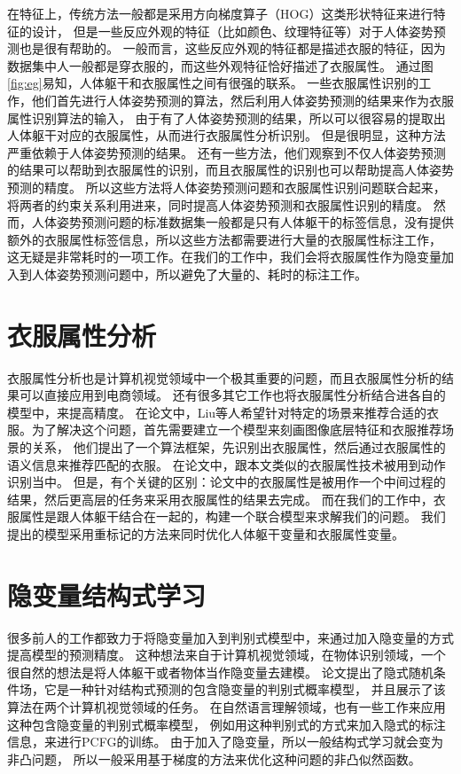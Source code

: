 在特征上，传统方法一般都是采用方向梯度算子（HOG）这类形状特征来进行特征的设计，
但是一些反应外观的特征（比如颜色、纹理特征等）对于人体姿势预测也是很有帮助的\cite{bmvc09}。
一般而言，这些反应外观的特征都是描述衣服的特征，因为数据集中人一般都是穿衣服的，而这些外观特征恰好描述了衣服属性。
通过图\ref{fig:eg}易知，人体躯干和衣服属性之间有很强的联系。
一些衣服属性识别的工作\cite{clotheccv,clothliu,poselets,junchi}，他们首先进行人体姿势预测的算法，然后利用人体姿势预测的结果来作为衣服属性识别算法的输入，
由于有了人体姿势预测的结果，所以可以很容易的提取出人体躯干对应的衣服属性，从而进行衣服属性分析识别。
但是很明显，这种方法严重依赖于人体姿势预测的结果。
还有一些方法\cite{cloth12,shen2014unified}，他们观察到不仅人体姿势预测的结果可以帮助到衣服属性的识别，而且衣服属性的识别也可以帮助提高人体姿势预测的精度。
所以这些方法将人体姿势预测问题和衣服属性识别问题联合起来，将两者的约束关系利用进来，同时提高人体姿势预测和衣服属性识别的精度。
然而，人体姿势预测问题的标准数据集一般都是只有人体躯干的标签信息，没有提供额外的衣服属性标签信息，所以这些方法都需要进行大量的衣服属性标注工作，
这无疑是非常耗时的一项工作。在我们的工作中，我们会将衣服属性作为隐变量加入到人体姿势预测问题中，所以避免了大量的、耗时的标注工作。

\section{衣服属性分析}
衣服属性分析也是计算机视觉领域中一个极其重要的问题，而且衣服属性分析的结果可以直接应用到电商领域。
还有很多其它工作也将衣服属性分析结合进各自的模型中，来提高精度。
在论文\cite{clothrec}中，Liu等人希望针对特定的场景来推荐合适的衣服。为了解决这个问题，首先需要建立一个模型来刻画图像底层特征和衣服推荐场景的关系，
他们提出了一个算法框架，先识别出衣服属性，然后通过衣服属性的语义信息来推荐匹配的衣服。
在论文\cite{action}中，跟本文类似的衣服属性技术被用到动作识别当中。
但是，有个关键的区别：论文\cite{action}中的衣服属性是被用作一个中间过程的结果，然后更高层的任务来采用衣服属性的结果去完成。
而在我们的工作中，衣服属性是跟人体躯干结合在一起的，构建一个联合模型来求解我们的问题。
我们提出的模型采用重标记的方法来同时优化人体躯干变量和衣服属性变量。

\section{隐变量结构式学习}
很多前人的工作都致力于将隐变量加入到判别式模型中，来通过加入隐变量的方式提高模型的预测精度。
这种想法来自于计算机视觉领域，在物体识别领域，一个很自然的想法是将人体躯干或者物体当作隐变量去建模。
论文\cite{HCRF}提出了隐式随机条件场，它是一种针对结构式预测的包含隐变量的判别式概率模型，
并且展示了该算法在两个计算机视觉领域的任务。
在自然语言理解领域，也有一些工作\cite{dlglv}来应用这种包含隐变量的判别式概率模型，
例如用这种判别式的方式来加入隐式的标注信息，来进行PCFG的训练。
由于加入了隐变量，所以一般结构式学习就会变为非凸问题，
所以一般采用基于梯度的方法来优化这种问题的非凸似然函数。

